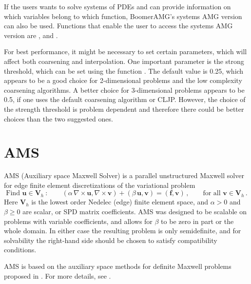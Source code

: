  
If the users wants to solve systems of PDEs and can provide information on
which variables belong to which function, BoomerAMG's systems AMG version
can also be used. Functions that enable the user to access the systems AMG version 
are , 
and .

For best performance, it might be necessary to set certain parameters, which will
affect both coarsening and interpolation.
One important parameter is the strong threshold, which can be set
using the function .
The default value is 0.25, which appears to be a good choice for 2-dimensional
problems and the low complexity coarsening algorithms. 
A better choice for 3-dimensional problems appears to be 0.5, if one uses the
default coarsening algorithm or CLJP. However,
the choice of the strength threshold is problem dependent and therefore
there could be better choices than the two suggested ones.


\section{AMS}
\label{AMS}

AMS (Auxiliary space Maxwell Solver) is a parallel unstructured Maxwell
solver for edge finite element discretizations of the variational problem
\begin{equation} \label{ams-maxwell}
\mbox{Find } {\mathbf u} \in {\mathbf V}_h \>:\qquad
(\alpha\, \nabla \times {\mathbf u},  \nabla \times {\mathbf v}) +
(\beta\, {\mathbf u},  {\mathbf v}) = ({\mathbf f},  {\mathbf v})\,,
\qquad \mbox{for all } {\mathbf v} \in {\mathbf V}_h \,.
\end{equation}
Here ${\mathbf V}_h$ is the lowest order Nedelec (edge) finite element space,
and $\alpha>0$ and $\beta \ge 0$ are scalar, or SPD matrix coefficients.
AMS was designed to be scalable on problems with variable coefficients,
and allows for $\beta$ to be zero in part or the whole domain.
In either  case the resulting problem is only semidefinite, and for solvability
the right-hand side should be chosen to satisfy compatibility conditions.

AMS is based on the auxiliary space methods for definite Maxwell
problems proposed in \cite{xu_H_curl}.
For more details, see \cite{h_curl_amg_report,ams_report}.

